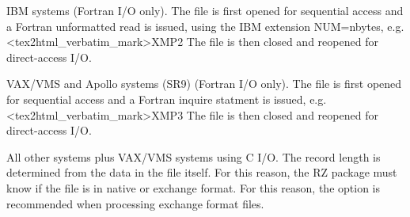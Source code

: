 \batchmode

\makeatletter
\makeindex
\newcommand{\FZfile}{FZ~file\index{FZ!Sequential input/output}\index{input/output!FZ}}
\newcommand{\RZfile}{RZ~file\index{RZ!Random input/output}\index{input/output!RZ}}
\newcommand{\IQUEST}{\Lit{IQUEST}\index{IQUEST@{\tt IQUEST}!user communication vector in common {\tt QUEST}}\index{IQUEST@{\tt IQUEST}!error reporting}\index{error reporting!{\tt IQUEST}}\index{QUEST@{\tt QUEST}!user communication common}}
\newcommand{\QUEST}{\Lit{QUEST}\index{IQUEST@{\tt IQUEST}!user communication vector in common {\tt QUEST}}\index{IQUEST@{\tt IQUEST}!error reporting}\index{error reporting!{\tt IQUEST}}\index{QUEST@{\tt QUEST}!user communication common}}
\renewcommand{\ZEBRA}{\textsc{ZEBRA}}
\renewcommand{\Copt}[1]{\texttt{#1}}
\renewcommand{\Ropt}[1]{\texttt{#1}}
\renewcommand{\Rarg}[1]{\texttt{#1}}
\def\condbreak#1{}
\setlongtables
\makeindex
{}
\PScommands\setcounter{secnumdepth}{3}
\setcounter{tocdepth}{2}
\newenvironment{landscapebody}{\begin{landscape}}{\end{landscape}}
\makeatletter
\def\LS@rot{\setbox\@outputbox=\vbox{\@rotr\@outputbox}}
\makeatother
\long{}
\renewcommand{\ZEBRA}{\textsc{ZEBRA}}\renewcommand{\Copt}[1]{\texttt{#1}}\renewcommand{\Ropt}[1]{\texttt{#1}}\renewcommand{\Rarg}[1]{\texttt{#1}}\def\condbreak#1{}\def\LS@rot{\setbox\@outputbox=\vbox{\@rotr\@outputbox}}\def\NODOC#1{#1}
\makeatother
\newenvironment{tex2html_wrap}{}{}
\usepackage{screen}

\pagestyle{empty}
\newpage

{\samepage \clearpage \begin{UL}\item IBM systems (Fortran I/O only). 
      The file is first opened for sequential
      access and a Fortran unformatted read is issued,
      using the IBM extension NUM=nbytes, e.g.
<tex2html_verbatim_mark>XMP2
      The file is then closed and reopened for direct-access
      I/O.
\item VAX/VMS and Apollo systems (SR9) (Fortran I/O only). 
      The file is first
      opened for sequential access and a Fortran inquire
      statment is issued, e.g.
<tex2html_verbatim_mark>XMP3
      The file is then closed and reopened for direct-access
      I/O.
\item All other systems plus VAX/VMS systems using C I/O.
      The record length is determined from the data in the file
      itself. For this reason, the RZ package must know if the
      file is in native or exchange format.
      For this reason, the option  is recommended
      when processing exchange format files.
\end{UL}
}



